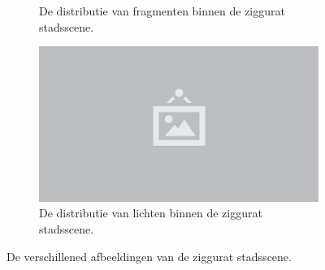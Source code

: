 \begin{figure}[p]
\begin{subfigure}[b]{.49\linewidth}
    \caption{De distributie van fragmenten binnen de ziggurat stadsscene.}\label{fig:test-suite-ziggurat:fragments}
  \end{subfigure}%
  \begin{subfigure}[b]{.49\linewidth}
    \centering\includegraphics{./img/raw/placeholder.png}
    \caption{De distributie van lichten binnen de ziggurat stadsscene.}\label{fig:test-suite-ziggurat:lights}
  \end{subfigure}%
  \caption{De verschillened afbeeldingen van de ziggurat stadsscene.}
  \label{fig:test-suite-ziggurat-images}
\end{figure}
